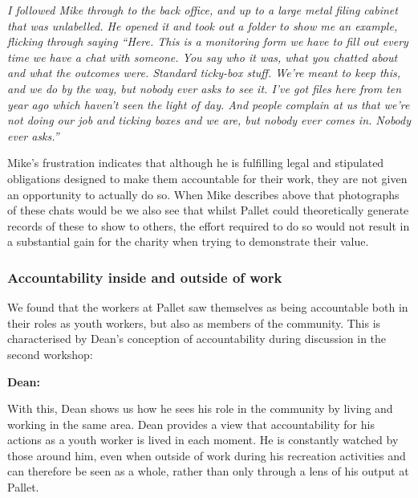 \textit{I followed Mike through to the back office, and up to a large metal filing cabinet that was unlabelled. He opened it and took out a folder to show me an example, flicking through saying ``Here. This is a monitoring form we have to fill out every time we have a chat with someone. You say who it was, what you chatted about and what the outcomes were. Standard ticky-box stuff. We're meant to keep this, and we do by the way, but nobody ever asks to see it. I've got files here from ten year ago which haven't seen the light of day. And people complain at us that we're not doing our job and ticking boxes and we are, but nobody ever comes in. Nobody ever asks.''}

Mike's frustration indicates that although he is fulfilling legal and stipulated obligations designed to make them accountable for their work, they are not given an opportunity to actually do so. When Mike describes above that photographs of these chats would be  we also see that whilst Pallet could theoretically generate records of these to show to others, the effort required to do so would not result in a substantial gain for the charity when trying to demonstrate their value.

\subsubsection{Accountability inside and outside of work}
We found that the workers at Pallet saw themselves as being accountable both in their roles as youth workers, but also as members of the community. This is characterised by Dean's conception of accountability during discussion in the second workshop:

\textbf{Dean:} 

With this, Dean shows us how he sees his role in the community by living and working in the same area. Dean provides a view that accountability for his actions as a youth worker is lived in each moment. He is constantly watched by those around him, even when outside of work during his recreation activities and can therefore be seen as a whole, rather than only through a lens of his output at Pallet.

